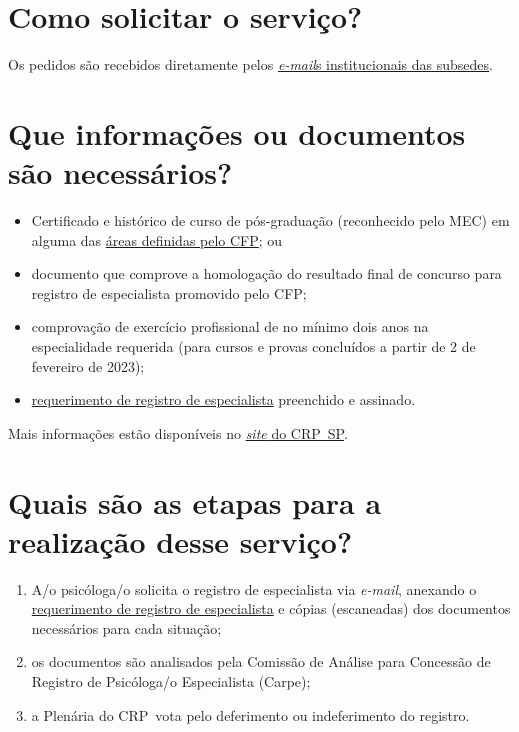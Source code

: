 \section{Como solicitar o	serviço?}

Os pedidos são recebidos diretamente pelos \href{https://crpsp.org/sede/index}{\emph{e-mail}s institucionais das subsedes}.
\vfill\clearpage

\section{Que informações ou documentos são necessários?}

\begin{itemize}
	\item
	Certificado e histórico de curso de pós-graduação (reconhecido pelo MEC) em alguma das
	\href{https://site.cfp.org.br/servicos/titulo-de-especialista/}{áreas definidas pelo CFP}; ou
	\item
	documento que comprove a homologação do resultado final de concurso para registro de especialista promovido pelo CFP;
	\item
	comprovação de exercício profissional de no mínimo dois anos na	especialidade requerida (para cursos e provas concluídos a partir de 2
	de fevereiro de 2023);
	\item
	\href{http://www.crpsp.org.br/arquivos/SP-Formulario-de-Requerimento-CARPE.pdf}{requerimento de	registro de especialista} preenchido e assinado.
\end{itemize}

Mais informações estão disponíveis no \href{http://www.crpsp.org/pagina/view/51}{\emph{site} do CRP~SP}.
\vfill

\section{Quais são as etapas para a realização desse serviço?}

\begin{enumerate}
	\item
	A/o psicóloga/o solicita o registro de especialista via \emph{e-mail},
	anexando o
	\href{http://www.crpsp.org.br/arquivos/SP-Formulario-de-Requerimento-CARPE.pdf}{requerimento de	registro de especialista} e cópias (escaneadas) dos documentos	necessários para cada situação;
	\item
	os documentos são analisados pela Comissão de Análise para Concessão de Registro de Psicóloga/o Especialista (Carpe);
	\item
	a Plenária do CRP~vota pelo deferimento ou indeferimento do registro.
\end{enumerate}
\vfill

